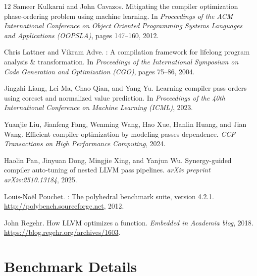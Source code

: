 \documentclass[11pt]{article}
\begin{document}
\begin{thebibliography}{12}
Sameer Kulkarni and John Cavazos.
\newblock Mitigating the compiler optimization phase-ordering problem using machine learning.
\newblock In \emph{Proceedings of the ACM International Conference on Object Oriented Programming Systems Languages and Applications (OOPSLA)}, pages 147--160, 2012.

Chris Lattner and Vikram Adve.
: A compilation framework for lifelong program analysis \& transformation.
\newblock In \emph{Proceedings of the International Symposium on Code Generation and Optimization (CGO)}, pages 75--86, 2004.

Jingzhi Liang, Lei Ma, Chao Qian, and Yang Yu.
\newblock Learning compiler pass orders using coreset and normalized value prediction.
\newblock In \emph{Proceedings of the 40th International Conference on Machine Learning (ICML)}, 2023.

Yuanjie Liu, Jianfeng Fang, Wenming Wang, Hao Xue, Hanlin Huang, and Jian Wang.
\newblock Efficient compiler optimization by modeling passes dependence.
\newblock \emph{CCF Transactions on High Performance Computing}, 2024.

Haolin Pan, Jinyuan Dong, Mingjie Xing, and Yanjun Wu.
\newblock Synergy-guided compiler auto-tuning of nested {LLVM} pass pipelines.
\newblock \emph{arXiv preprint arXiv:2510.13184}, 2025.

Louis-No\"el Pouchet.
: The polyhedral benchmark suite, version 4.2.1.
\newblock \url{http://polybench.sourceforge.net}, 2012.

John Regehr.
\newblock How {LLVM} optimizes a function.
\newblock \emph{Embedded in Academia blog}, 2018.
\newblock \url{https://blog.regehr.org/archives/1603}.

\end{thebibliography}

\appendix

\section{Benchmark Details}
\label{app:benchmarks}
\end{document}
